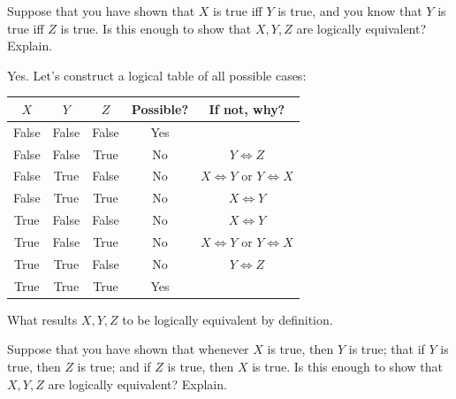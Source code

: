 \begin{exercise}
    Suppose that you have shown that $X$ is true iff $Y$ is true, and you know that $Y$ is true iff $Z$ is true. Is this enough to show that $X, Y, Z$ are logically equivalent? Explain.
\end{exercise}
\begin{solution}
    Yes. Let's construct a logical table of all possible cases:
    \begin{center}
        \begin{tabular}{ccccc}
            $X$ & $Y$ & $Z$ & Possible? & If not, why?\\
            \hline
            False & False & False & Yes\\
            False & False & True & No & $Y \Leftrightarrow Z$\\
            False & True & False & No & $X \Leftrightarrow Y$ or $Y \Leftrightarrow X$\\
            False & True & True & No & $X \Leftrightarrow Y$\\
            True & False & False & No & $X \Leftrightarrow Y$\\
            True & False & True & No & $X \Leftrightarrow Y$ or $Y \Leftrightarrow X$\\
            True & True & False & No & $Y \Leftrightarrow Z$\\
            True & True & True & Yes\\
        \end{tabular}
    \end{center}
    What results $X, Y, Z$ to be logically equivalent by definition.
\end{solution}
\begin{exercise}
    Suppose that you have shown that whenever $X$ is true, then $Y$ is true; that if $Y$ is true, then $Z$ is true; and if $Z$ is true, then $X$ is true. Is this enough to show that $X, Y, Z$ are logically equivalent? Explain.
\end{exercise}
